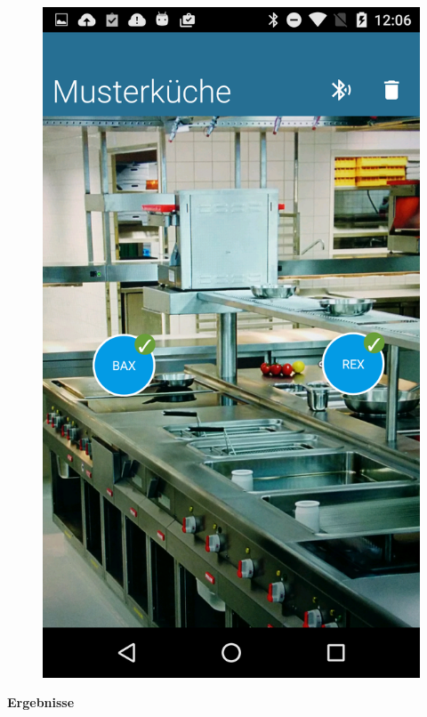 \begin{figure}
	\vspace{0.1cm}
	\begin{center}
		\includegraphics[scale=0.12]{start/img/screenshot}
	\end{center}
	\vspace{-1cm}
\end{figure}

\textbf{Ergebnisse}

